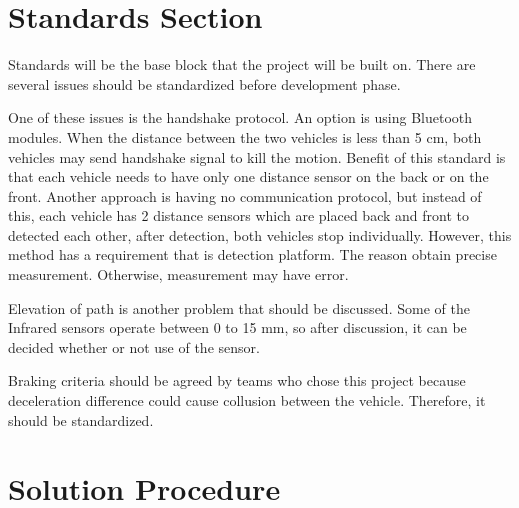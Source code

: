 \documentclass[a4paper,12pt]{article}
\begin{document}
	
	
	
	




	

\section{Standards Section}
Standards will be the base block that the project will be built on. There are several issues should be standardized before development phase. 

One of these issues is the handshake protocol. An option is using Bluetooth modules. When the distance between the two vehicles is less than 5 cm, both vehicles may send handshake signal to kill the motion. Benefit of this standard is that each vehicle needs to have only one distance sensor on the back or on the front. Another approach is having no communication protocol, but instead of this, each vehicle has 2 distance sensors which are placed back and front to detected each other, after detection, both vehicles stop individually. However, this method has a requirement that is detection platform. The reason obtain precise measurement. Otherwise, measurement may have error.  

Elevation of path is another problem that should be discussed. Some of the Infrared sensors operate between 0 to 15 mm, so after discussion, it can be decided whether or not use of the sensor. 

Braking criteria should be agreed by teams who chose this project because deceleration difference could cause collusion between the vehicle. Therefore, it should be standardized.      




\section{Solution Procedure}
\end{document}
